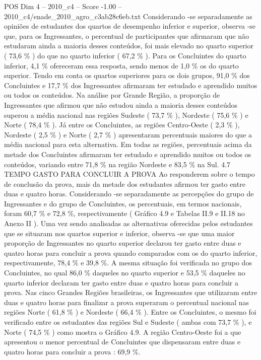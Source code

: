 \begin{textsample}{POS Dim 4 – 2010\_c4 – Score -1.00 – 2010\_c4/enade\_2010\_agro\_c3ab28c6eb.txt}
Considerando -se separadamente as opiniões de estudantes dos quartos de desempenho inferior e superior, observa -se que, para os Ingressantes, o percentual de participantes que afirmaram que não estudaram ainda a maioria desses conteúdos, foi mais elevado no quarto superior ( 73,6 \% ) do que no quarto inferior ( 67,2 \% ).
Para os Concluintes do quarto inferior, 4,1 \% ofereceram essa resposta, sendo menos de 1,0 \% os do quarto superior.
Tendo em conta os quartos superiores para os dois grupos, 91,0 \% dos Concluintes e 17,7 \% dos Ingressantes afirmaram ter estudado e aprendido muitos ou todos os conteúdos.
Na análise por Grande Região, a proporção de Ingressantes que afirmou que não estudou ainda a maioria desses conteúdos superou a média nacional nas regiões Sudeste ( 73,7 \% ), Nordeste ( 75,6 \% ) e Norte ( 78,4 \% ).
Já entre os Concluintes, as regiões Centro-Oeste ( 2,3 \% ), Nordeste ( 2,5 \% ) e Norte ( 2,7 \% ) apresentaram percentuais maiores do que a média nacional para esta alternativa.
Em todas as regiões, percentuais acima da metade dos Concluintes afirmaram ter estudado e aprendido muitos ou todos os conteúdos, variando entre 71,8 \% na região Nordeste e 83,5 \% na Sul. 4.7 TEMPO GASTO PARA CONCLUIR A PROVA Ao responderem sobre o tempo de conclusão da prova, mais da metade dos estudantes afirmou ter gasto entre duas e quatro horas.
Considerando -se separadamente as percepções do grupo de Ingressantes e do grupo de Concluintes, os percentuais, em termos nacionais, foram 60,7 \% e 72,8 \%, respectivamente ( Gráfico 4.9 e Tabelas II.9 e II.18 no Anexo II ).
Uma vez sendo analisadas as alternativas oferecidas pelos estudantes que se situaram nos quartos superior e inferior, observa -se que uma maior proporção de Ingressantes no quarto superior declarou ter gasto entre duas e quatro horas para concluir a prova quando comparados com os do quarto inferior, respectivamente, 78,4 \% e 39,8 \%.
A mesma situação foi verificada no grupo dos Concluintes, no qual 86,0 \% daqueles no quarto superior e 53,5 \% daqueles no quarto inferior declaram ter gasto entre duas e quatro horas para concluir a prova.
Nas cinco Grandes Regiões brasileiras, os Ingressantes que utilizaram entre duas e quatro horas para finalizar a prova superaram o percentual nacional nas regiões Norte ( 61,8 \% ) e Nordeste ( 66,4 \% ).
Entre os Concluintes, o mesmo foi verificado entre os estudantes das regiões Sul e Sudeste ( ambas com 73,7 \% ), e Norte ( 74,5 \% ) como mostra o Gráfico 4.9.
A região Centro-Oeste foi a que apresentou o menor percentual de Concluintes que dispensaram entre duas e quatro horas para concluir a prova : 69,9 \%.

\end{textsample}

